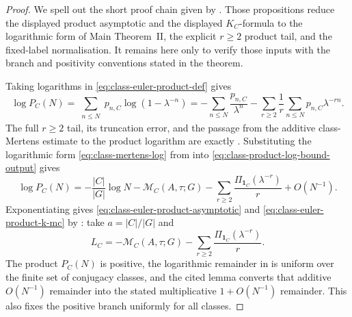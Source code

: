 \documentclass[11pt,a4paper]{amsart}
\theoremstyle{plain}
\theoremstyle{definition}
\theoremstyle{remark}
\begin{document}
\begin{proof}
  We spell out the short proof chain given by
  .
  Those propositions reduce the displayed product asymptotic and the displayed
  \(K_C\)-formula to the logarithmic form of Main Theorem~II, the explicit
  \(r\ge2\) product tail, and the fixed-label normalisation.  It remains here
  only to verify those inputs with the branch and positivity conventions stated
  in the theorem.

  Taking logarithms in \eqref{eq:class-euler-product-def} gives
  \[
    \log P_C(N)
    =
    \sum_{\substack{n\le N}}
      p_{n,C}\log(1-\lambda^{-n})
    =
    -\sum_{n\le N}\frac{p_{n,C}}{\lambda^n}
      -
      \sum_{r\ge2}\frac{1}{r}
        \sum_{n\le N}p_{n,C}\lambda^{-rn}.
  \]
  The full \(r\ge2\) tail, its truncation error, and the passage from the
  additive class-Mertens estimate to the product logarithm are exactly
  .  Substituting the logarithmic
  form \eqref{eq:class-mertens-log} from 
  into \eqref{eq:class-product-log-bound-output} gives
  \[
    \log P_C(N)
    =
    -\frac{|C|}{|G|}\log N
    -\mathcal M_C(A,\tau;G)
    -\sum_{r\ge2}\frac{\Pi_{\mathbf1_C}(\lambda^{-r})}{r}
    +O(N^{-1}).
  \]
  Exponentiating gives \eqref{eq:class-euler-product-asymptotic} and
  \eqref{eq:class-euler-product-k-mc} by
  : take
  \(a=|C|/|G|\) and
  \[
    L_C=-\mathcal M_C(A,\tau;G)
    -\sum_{r\ge2}\frac{\Pi_{\mathbf1_C}(\lambda^{-r})}{r}.
  \]
  The product \(P_C(N)\) is positive, the logarithmic remainder in
   is uniform over the finite set of
  conjugacy classes, and the cited lemma converts that additive
  \(O(N^{-1})\) remainder into the stated multiplicative
  \(1+O(N^{-1})\) remainder.  This also fixes the positive branch uniformly for
  all classes.


\end{proof}
\end{document}

